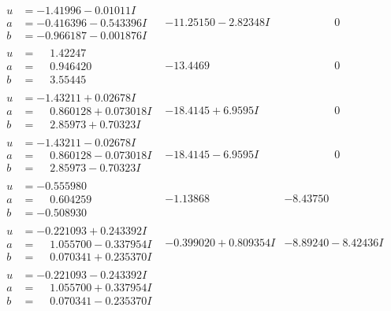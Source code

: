 \documentclass[1p]{elsarticle_modified}
\theoremstyle{definition}
\begin{document}
$$\begin{array}{c|c|c}
\begin{aligned}
u &= -1.41996 - 0.01011 I \\
a &= -0.416396 - 0.543396 I \\
b &= -0.966187 - 0.001876 I\end{aligned}
 & -11.25150 - 2.82348 I & \phantom{-0.000000 } 0 \\ \hline\begin{aligned}
u &= \phantom{-}1.42247\phantom{ +0.000000I} \\
a &= \phantom{-}0.946420\phantom{ +0.000000I} \\
b &= \phantom{-}3.55445\phantom{ +0.000000I}\end{aligned}
 & -13.4469\phantom{ +0.000000I} & \phantom{-0.000000 } 0 \\ \hline\begin{aligned}
u &= -1.43211 + 0.02678 I \\
a &= \phantom{-}0.860128 + 0.073018 I \\
b &= \phantom{-}2.85973 + 0.70323 I\end{aligned}
 & -18.4145 + 6.9595 I & \phantom{-0.000000 } 0 \\ \hline\begin{aligned}
u &= -1.43211 - 0.02678 I \\
a &= \phantom{-}0.860128 - 0.073018 I \\
b &= \phantom{-}2.85973 - 0.70323 I\end{aligned}
 & -18.4145 - 6.9595 I & \phantom{-0.000000 } 0 \\ \hline\begin{aligned}
u &= -0.555980\phantom{ +0.000000I} \\
a &= \phantom{-}0.604259\phantom{ +0.000000I} \\
b &= -0.508930\phantom{ +0.000000I}\end{aligned}
 & -1.13868\phantom{ +0.000000I} & -8.43750\phantom{ +0.000000I} \\ \hline\begin{aligned}
u &= -0.221093 + 0.243392 I \\
a &= \phantom{-}1.055700 - 0.337954 I \\
b &= \phantom{-}0.070341 + 0.235370 I\end{aligned}
 & -0.399020 + 0.809354 I & -8.89240 - 8.42436 I \\ \hline\begin{aligned}
u &= -0.221093 - 0.243392 I \\
a &= \phantom{-}1.055700 + 0.337954 I \\
b &= \phantom{-}0.070341 - 0.235370 I\end{aligned}

\end{array}$$
\end{document}
